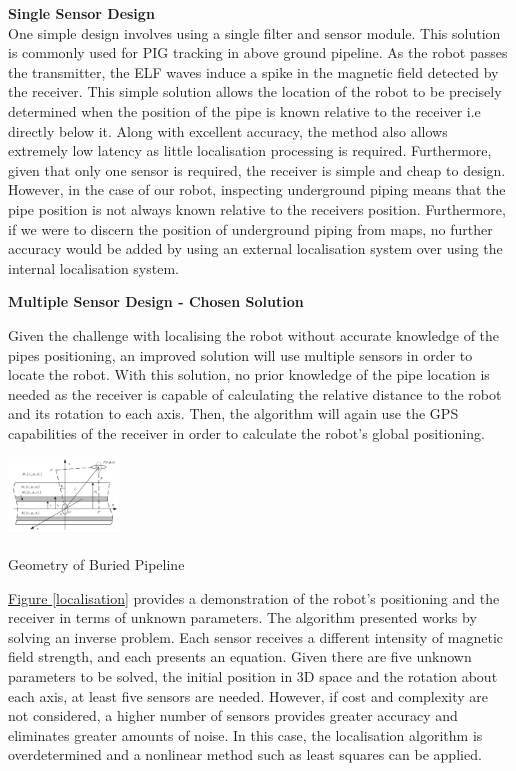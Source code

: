 \documentclass[11pt]{article}		%
\newcommand{\supercite}[1]{\textsuperscript{\cite{#1}}}		%
\newcommand{\figref}[1]{\hyperref[#1]{Figure \ref*{#1}}}    %
\begin{document}
			\textbf{Single Sensor Design}\\
			One simple design involves using a single filter and sensor module. This solution is commonly used for PIG tracking in above ground pipeline. As the robot passes the transmitter, the ELF waves induce a spike in the magnetic field detected by the receiver. This simple solution allows the location of the robot to be precisely determined when the position of the pipe is known relative to the receiver i.e directly below it. Along with excellent accuracy, the method also allows extremely low latency as little localisation processing is required. Furthermore, given that only one sensor is required, the receiver is simple and cheap to design. \\
	    	\hspace*{3ex}However, in the case of our robot, inspecting underground piping means that the pipe position is not always known relative to the receivers position. Furthermore, if we were to discern the position of underground piping from maps, no further accuracy would be added by using an external localisation system over using the internal localisation system. 
	
	        \textbf{Multiple Sensor Design - Chosen Solution}
			
		    Given the challenge with localising the robot without accurate knowledge of the pipes positioning, an improved solution will use multiple sensors in order to locate the robot. With this solution, no prior knowledge of the pipe location is needed as the receiver is capable of calculating the relative distance to the robot and its rotation to each axis. Then, the algorithm will again use the GPS capabilities of the receiver in order to calculate the robot's global positioning.
			
			\begin{floatingfigure}[r]{0.25\textwidth}
				\centering
				\includegraphics[width=0.22\textwidth]{localisation}
				\caption{Geometry of Buried Pipeline\supercite{ELFTransmitter}}
				\label{localisation}
			\end{floatingfigure}
			
			\hspace*{3ex} \figref{localisation} provides a demonstration of the robot's positioning and the receiver in terms of unknown parameters. The algorithm presented works by solving an inverse problem. Each sensor receives a different intensity of magnetic field strength, and each presents an equation. Given there are five unknown parameters to be solved, the initial position in 3D space and the rotation about each axis, at least five sensors are needed. However, if cost and complexity are not considered, a higher number of sensors provides greater accuracy and eliminates greater amounts of noise. In this case, the localisation algorithm is overdetermined and a nonlinear method such as least squares can be applied. \\
			
\end{document}
